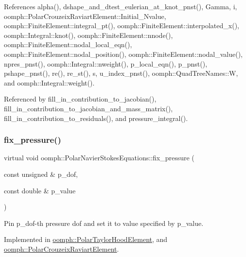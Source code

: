 References alpha(), dshape\+\_\+and\+\_\+dtest\+\_\+eulerian\+\_\+at\+\_\+knot\+\_\+pnst(), Gamma, i, oomph\+::\+Polar\+Crouzeix\+Raviart\+Element\+::\+Initial\+\_\+\+Nvalue, oomph\+::\+Finite\+Element\+::integral\+\_\+pt(), oomph\+::\+Finite\+Element\+::interpolated\+\_\+x(), oomph\+::\+Integral\+::knot(), oomph\+::\+Finite\+Element\+::nnode(), oomph\+::\+Finite\+Element\+::nodal\+\_\+local\+\_\+eqn(), oomph\+::\+Finite\+Element\+::nodal\+\_\+position(), oomph\+::\+Finite\+Element\+::nodal\+\_\+value(), npres\+\_\+pnst(), oomph\+::\+Integral\+::nweight(), p\+\_\+local\+\_\+eqn(), p\+\_\+pnst(), pshape\+\_\+pnst(), re(), re\+\_\+st(), s, u\+\_\+index\+\_\+pnst(), oomph\+::\+Quad\+Tree\+Names\+::W, and oomph\+::\+Integral\+::weight().



Referenced by fill\+\_\+in\+\_\+contribution\+\_\+to\+\_\+jacobian(), fill\+\_\+in\+\_\+contribution\+\_\+to\+\_\+jacobian\+\_\+and\+\_\+mass\+\_\+matrix(), fill\+\_\+in\+\_\+contribution\+\_\+to\+\_\+residuals(), and pressure\+\_\+integral().

\mbox{\label{classoomph_1_1PolarNavierStokesEquations_a80333b602104b12993c7d3b242d2adfb}} 
\subsubsection{\texorpdfstring{fix\+\_\+pressure()}{fix\_pressure()}}
{\footnotesize\ttfamily virtual void oomph\+::\+Polar\+Navier\+Stokes\+Equations\+::fix\+\_\+pressure (\begin{DoxyParamCaption}\item[{const unsigned \&}]{p\+\_\+dof,  }\item[{const double \&}]{p\+\_\+value }\end{DoxyParamCaption})\hspace{0.3cm}{\ttfamily [pure virtual]}}



Pin p\+\_\+dof-\/th pressure dof and set it to value specified by p\+\_\+value. 



Implemented in \hyperlink{classoomph_1_1PolarTaylorHoodElement_aea2da4c0a1114dacbf15d463da2f3d4f}{oomph\+::\+Polar\+Taylor\+Hood\+Element}, and \hyperlink{classoomph_1_1PolarCrouzeixRaviartElement_a10ce59c8e1796c0fcac9c0b3b6a89568}{oomph\+::\+Polar\+Crouzeix\+Raviart\+Element}.



